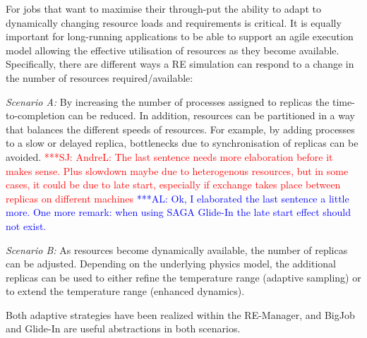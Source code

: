 \documentclass{rspublic}
\newcommand{\alnote}[1]{ {\textcolor{blue} { ***AL: #1 }}}
\newcommand{\jhanote}[1]{ {\textcolor{red} { ***SJ: #1 }}}
\newcommand{\alnote}[1]{}
\newcommand{\jhanote}[1]{}
\newcommand{\glidein}[1]{Glide-In }
\begin{document}

For jobs that want to maximise their through-put the ability to adapt
to dynamically changing resource loads and requirements is
critical. It is equally important for long-running applications to be
able to support an agile execution model allowing the effective
utilisation of resources as they become available.  Specifically,
there are different ways a RE simulation can respond to a change in
the number of resources required/available:
\begin{compactitem}         
\item {\it Scenario A:} By increasing the number of processes assigned
  to replicas the time-to-completion can be reduced. In addition,
  resources can be partitioned in a way that balances the different
  speeds of resources.  For example, by adding processes to a slow or
  delayed replica, bottlenecks due to synchronisation of replicas can
  be avoided.
  \jhanote{AndreL: The last sentence needs more elaboration before it
    makes sense. Plus slowdown maybe due to heterogenous resources,
    but in some cases, it could be due to late start, especially if
    exchange takes place between replicas on different machines}
  \alnote{Ok, I elaborated the last sentence a little more. One more
    remark: when using SAGA Glide-In the late start effect should not
    exist.}

\item {\it Scenario B:} As resources become dynamically available, the
  number of replicas can be adjusted. Depending on the underlying
  physics model, the additional replicas can be used to either refine
  the temperature range (adaptive sampling) or to extend the
  temperature range (enhanced dynamics).
\end{compactitem}           
Both adaptive strategies have been realized within the RE-Manager, and
BigJob and Glide-In are useful abstractions in both scenarios. 


\end{document}
